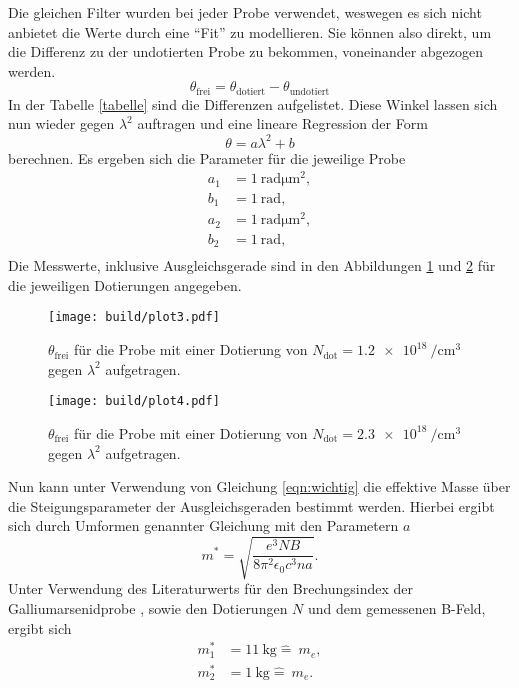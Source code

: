 Die gleichen Filter wurden bei jeder Probe verwendet, weswegen es sich nicht anbietet die Werte durch eine \enquote{Fit} zu modellieren.
Sie können also direkt, um die Differenz zu der undotierten Probe zu bekommen, voneinander abgezogen werden.
\begin{equation}
\theta_{\text{frei}} = \theta_{\text{dotiert}} - \theta_{\text{undotiert}}
\end{equation}
In der Tabelle \ref{tabelle} sind die Differenzen aufgelistet. Diese Winkel lassen sich nun wieder gegen $\lambda^2$ auftragen und eine lineare Regression
der Form
\begin{equation}
\theta = a \lambda^2 + b
\end{equation}
berechnen.
Es ergeben sich die Parameter für die jeweilige Probe
\begin{align*}
a_{1} &= \SI{1}{\radian\micro\meter\squared},\\
b_{1} &= \SI{1}{\radian}, \\
a_{2} &= \SI{1}{\radian\micro\meter\squared},\\
b_{2} &= \SI{1}{\radian}, \\
\end{align*}
Die Messwerte, inklusive Ausgleichsgerade sind in den Abbildungen \ref{plt1} und \ref{plt2} für die jeweiligen Dotierungen angegeben.
\begin{figure}
    \centering
    \texttt{[image: build/plot3.pdf]}
    \caption{$\theta_{\text{frei}}$ für die Probe mit einer Dotierung von $N_{\text{dot}}=\SI{1.2e18}{\per\centi\meter^3}$ gegen $\lambda^2$ aufgetragen.}
    \label{plt1}
\end{figure}
\begin{figure}
    \centering
    \texttt{[image: build/plot4.pdf]}
    \caption{$\theta_{\text{frei}}$ für die Probe mit einer Dotierung von $N_{\text{dot}}=\SI{2.3e18}{\per\centi\meter^3}$ gegen $\lambda^2$ aufgetragen.}
    \label{plt2}
\end{figure}
Nun kann unter Verwendung von Gleichung \eqref{eqn:wichtig} die effektive Masse über die Steigungsparameter der Ausgleichsgeraden bestimmt werden.
Hierbei ergibt sich durch Umformen genannter Gleichung mit den Parametern $a$
\begin{equation}
m^{*} = \sqrt{\frac{e^3 NB}{8 \pi^2 \epsilon_0 c^3 n a}}.
\end{equation}
Unter Verwendung des Literaturwerts für den Brechungsindex der Galliumarsenidprobe \cite{GaAs}, sowie den Dotierungen $N$ und dem gemessenen B-Feld, ergibt sich
\begin{align}
m_1^{*} &= \SI{11}{\kilo\gram} \hat{=} \SI{}{}m_e,\\
m_2^{*} &= \SI{1}{\kilo\gram} \hat{=} \SI{}{}m_e.
\end{align}